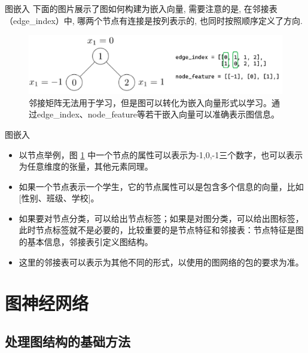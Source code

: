 \documentclass{beamer}
\begin{document}
\begin{frame}{图嵌入}
    下面的图片展示了图如何构建为嵌入向量, 需要注意的是, 在邻接表（edge\_index）中, 哪两个节点有连接是按列表示的, 也同时按照顺序定义了方向.
    \begin{figure}
        \includegraphics[width=\textwidth]{graph_sample.png}
        \caption{邻接矩阵无法用于学习，但是图可以转化为嵌入向量形式以学习。通过edge\_index、node\_feature等若干嵌入向量可以准确表示图信息。}\label{图嵌入}
    \end{figure}
\end{frame}

\begin{frame}{图嵌入}
    \begin{itemize}[<+-| alert@+>]
        \item 以节点举例，图 \ref{图嵌入} 中一个节点的属性可以表示为-1,0,-1三个数字，也可以表示为任意维度的张量，其他元素同理。
        \item 如果一个节点表示一个学生，它的节点属性可以是包含多个信息的向量，比如[性别、班级、学校]。
        \item 如果要对节点分类，可以给出节点标签；如果是对图分类，可以给出图标签，此时节点标签就不是必要的，比较重要的是节点特征和邻接表：节点特征是图的基本信息，邻接表引定义图结构。
        \item 这里的邻接表可以表示为其他不同的形式，以使用的图网络的包的要求为准。
    \end{itemize}
\end{frame}

\section{图神经网络}

\subsection{处理图结构的基础方法}
\end{document}
